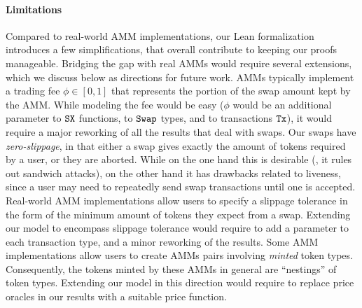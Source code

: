 \paragraph*{Limitations}
Compared to real-world AMM implementations, 
our Lean formalization introduces a few simplifications, that overall contribute to keeping our proofs manageable. Bridging the gap with real AMMs would require several extensions, which we discuss below as directions for future work.
%
AMMs typically implement a trading fee $\phi \in [0,1]$ that represents the portion of the swap amount kept by the AMM. 
While modeling the fee would be easy
($\phi$ would be an additional parameter to $\code{SX}$ functions, to $\code{Swap}$ types, and to transactions $\code{Tx}$), it would require a major reworking of all the results that deal with swaps. 
%
Our swaps have \emph{zero-slippage}, in that either a swap gives exactly the amount of  tokens required by a user, or they are aborted. While on the one hand this is desirable (\eg, it rules out sandwich attacks), on the other hand it has drawbacks related to liveness, since a user may need to repeatedly send swap transactions until one is accepted. Real-world AMM implementations allow users to specify a slippage tolerance in the form of the minimum amount of tokens they expect from a swap. Extending our model to encompass slippage tolerance would require to add a parameter to each transaction type, and a minor reworking of the results.
%
Some AMM implementations allow users to create AMMs pairs involving \emph{minted} token types. Consequently, the tokens minted by these AMMs in general are ``nestings'' of token types. Extending our model in this direction would require 
to replace price oracles in our results with a suitable price function.